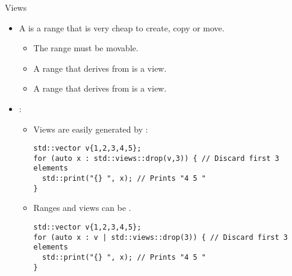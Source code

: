 \begin{frame}[t,fragile]{Views}
\begin{itemize}
  \item A  is a range that is very cheap to create, copy or move.
    \begin{itemize}
      \item The range must be movable.
      \item A range that derives from  is a view.
      \item A range that derives from  is a view.
    \end{itemize}

  \item {}:
    \begin{itemize}

      \item Views are easily generated by :
\begin{lstlisting}
std::vector v{1,2,3,4,5};
for (auto x : std::views::drop(v,3)) { // Discard first 3 elements
  std::print("{} ", x); // Prints "4 5 "
}
\end{lstlisting}

      \item Ranges and views can be .
\begin{lstlisting}
std::vector v{1,2,3,4,5};
for (auto x : v | std::views::drop(3)) { // Discard first 3 elements
  std::print("{} ", x); // Prints "4 5 "
}
\end{lstlisting}

    \end{itemize}


\end{itemize}
\end{frame}


